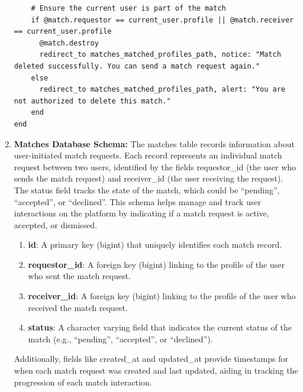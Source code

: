 \begin{enumerate}
\begin{lstlisting}
    # Ensure the current user is part of the match
    if @match.requestor == current_user.profile || @match.receiver == current_user.profile
      @match.destroy
      redirect_to matches_matched_profiles_path, notice: "Match deleted successfully. You can send a match request again."
    else
      redirect_to matches_matched_profiles_path, alert: "You are not authorized to delete this match."
    end
end
    \end{lstlisting}

    \newpage
    \item \textbf{Matches Database Schema:}
    The matches table records information about user-initiated match requests. Each record represents an individual match request between two users, identified by the fields requestor\_id (the user who sends the match request) and receiver\_id (the user receiving the request). The status field tracks the state of the match, which could be “pending”, “accepted”, or “declined”. This schema helps manage and track user interactions on the platform by indicating if a match request is active, accepted, or dismissed.
    
    \begin{enumerate}
    \item \textbf{id}: A primary key (bigint) that uniquely identifies each match record.
    \item \textbf{requestor\_id}: A foreign key (bigint) linking to the profile of the user who sent the match request.
    \item \textbf{receiver\_id}: A foreign key (bigint) linking to the profile of the user who received the match request.
    \item \textbf{status}: A character varying field that indicates the current status of the match (e.g., “pending”, “accepted”, or “declined”).
    \end{enumerate}
    
    \bigskip Additionally, fields like created\_at and updated\_at provide timestamps for when each match request was created and last updated, aiding in tracking the progression of each match interaction.
    

\end{enumerate}
